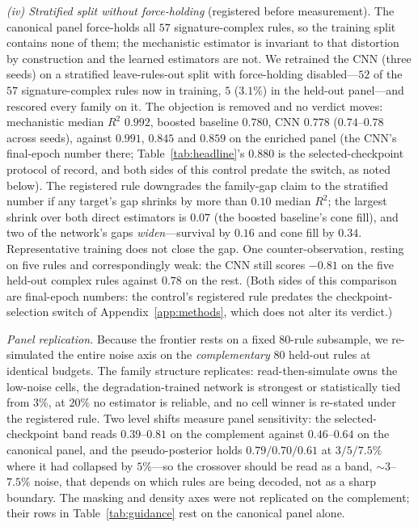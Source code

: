 \documentclass[aip,cha,amsmath,amssymb,reprint,floatfix]{revtex4-2}
\newcommand{\rtwo}{$R^2$}
\begin{document}
\emph{(iv) Stratified split without force-holding} (registered before
measurement). The
canonical panel force-holds all $57$ signature-complex rules, so the training
split contains none of them; the mechanistic estimator is invariant to that
distortion by construction and the learned estimators are not. We retrained the
CNN (three seeds) on a stratified leave-rules-out split with force-holding
disabled---$52$ of the $57$ signature-complex rules now in training, $5$
($3.1\%$) in the held-out panel---and rescored every family on it. The
objection is removed and no verdict moves: mechanistic median \rtwo{} $0.992$,
boosted baseline $0.780$, CNN $0.778$ ($0.74$--$0.78$ across seeds), against
$0.991$, $0.845$ and $0.859$ on the enriched panel (the CNN's final-epoch
number there; Table~\ref{tab:headline}'s $0.880$ is the selected-checkpoint
protocol of record, and both sides of this control predate the switch, as
noted below). The registered rule
downgrades the family-gap claim to the stratified number if any target's gap
shrinks by more than $0.10$ median \rtwo{}; the largest shrink over both direct
estimators is $0.07$ (the boosted baseline's cone fill), and two of the
network's gaps \emph{widen}---survival by $0.16$ and cone fill by $0.34$.
Representative training does not close the gap. One counter-observation, resting on
five rules and correspondingly weak: the CNN still scores $-0.81$ on the five
held-out complex rules against $0.78$ on the rest. (Both sides of this comparison are final-epoch numbers: the control's
registered rule predates the checkpoint-selection switch of
Appendix~\ref{app:methods}, which does not alter its verdict.)

\emph{Panel replication.} Because the frontier rests on a fixed $80$-rule
subsample, we re-simulated the entire noise axis on the \emph{complementary}
$80$ held-out rules at identical budgets. The family structure replicates:
read-then-simulate owns the low-noise cells, the degradation-trained network
is strongest or statistically tied from $3\%$, at $20\%$ no estimator is
reliable, and no cell winner is re-stated under the registered rule. Two
level shifts measure panel sensitivity: the selected-checkpoint band reads
$0.39$--$0.81$ on the complement against $0.46$--$0.64$ on the canonical
panel, and the pseudo-posterior holds $0.79/0.70/0.61$ at $3/5/7.5\%$ where
it had collapsed by $5\%$---so the crossover should be read as a band,
${\sim}3$--$7.5\%$
noise, that depends on which rules are being decoded, not as a sharp
boundary. The masking and
density axes were not replicated on the complement; their rows in
Table~\ref{tab:guidance} rest on the canonical panel alone.
\end{document}
